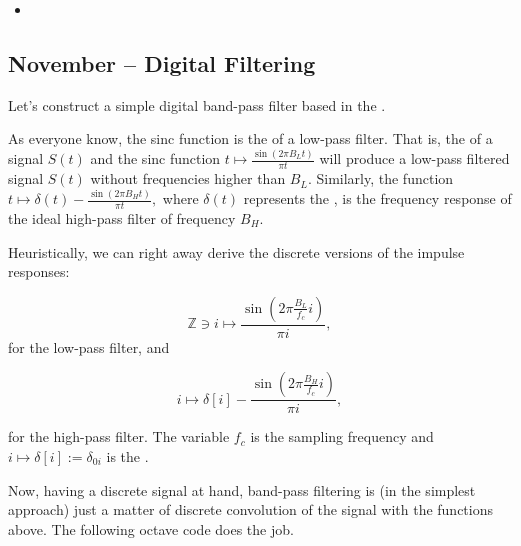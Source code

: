 \documentclass{article}
\begin{document}
\begin{itemize}
\item  {}
\end{itemize}
  
\subsection{November – Digital Filtering}

Let's construct a simple digital band-pass filter based in the .

As everyone know, the sinc function is the  of a low-pass filter. That is, the  of a signal $ S(t)$ and the sinc function $ t \mapsto \frac{\sin(2 \pi B_L t)}{\pi t}$ will produce a low-pass filtered signal $S(t)$ without frequencies higher than $B_L$. Similarly, the function $ t \mapsto \delta(t) -  \frac{\sin(2 \pi B_H t)}{\pi t},$ where $ \delta(t)$ represents the , is the frequency response of the ideal high-pass filter of frequency $B_H$.

Heuristically, we can right away derive the discrete versions of the impulse responses:

$$
\mathbb{Z} \ni i \mapsto \frac{\sin(2 \pi \frac{B_L}{f_c} i)}{\pi i},
$$
for the low-pass filter, and

$$
 i \mapsto \delta[i] - \frac{\sin(2 \pi \frac{B_H}{f_c} i)}{\pi i},
$$

for the high-pass filter. The variable $f_c$ is the sampling frequency and  $i \mapsto \delta[i] := \delta_{0i} $ is the .

Now, having a discrete signal at hand, band-pass filtering  is (in the simplest approach) just a matter of discrete convolution of the signal with the functions above. The following octave code does the job.
\end{document}
